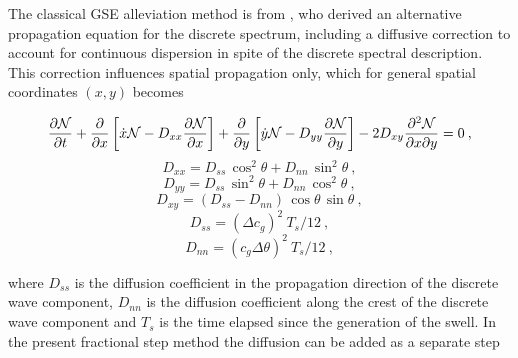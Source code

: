 
\vspace{\baselineskip} 
\vspace{\baselineskip} 


\noindent
The classical GSE alleviation method is from \cite{art:BH87}, who derived an
alternative propagation equation for the discrete spectrum, including a
diffusive correction to account for continuous dispersion in spite of the
discrete spectral description. This correction influences spatial propagation
only, which for general spatial coordinates $(x,y)$ becomes


\begin{equation}
\frac{\partial {\cal N}}{\partial t} +
\frac{\partial}{\partial x} \left [ \dot{x} {\cal N} 
           - D_{xx} \frac{\partial {\cal N}}{\partial x} \right ] +
\frac{\partial}{\partial y} \left [ \dot{y} {\cal N} 
           - D_{yy} \frac{\partial {\cal N}}{\partial y} \right ] -
2 D_{xy} \frac{\partial^2 {\cal N}}{\partial x \partial y} = 0
\: , \label{eq:d_bal_0}\end{equation}  \begin{equation}
D_{xx} = D_{ss} \, \cos^2 \theta + D_{nn} \, \sin^2 \theta
\: , \label{eq:Dxx} \end{equation} \begin{equation}
D_{yy} = D_{ss} \, \sin^2 \theta + D_{nn} \, \cos^2 \theta
\: , \label{eq:Dyy} \end{equation}  \begin{equation}
D_{xy} = ( D_{ss} - D_{nn} ) \, \cos \theta \, \sin \theta
\: , \label{eq:Dxy} \end{equation} \begin{equation}
D_{ss} = (\Delta c_g )^2 \: T_s / 12
\: , \label{eq:Dss} \end{equation} \begin{equation}
D_{nn} =  ( c_g \Delta \theta )^2 \: T_s / 12
\: , \label{eq:Dnn} \end{equation}

\noindent
where $D_{ss}$ is the diffusion coefficient in the propagation direction of
the discrete wave component, $D_{nn}$ is the diffusion coefficient along the
crest of the discrete wave component and $T_s$ is the time elapsed since the
generation of the swell. In the present fractional step method the diffusion
can be added as a separate step

